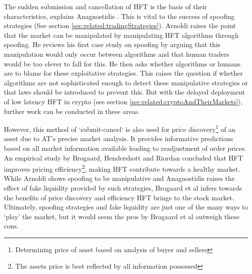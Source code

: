 The sudden submission and cancellation of HFT is the basis of their characteristics, explains Anagnostidis \cite{UNPUB:Anagnostidis:2017}. This is vital to the success of spoofing strategies (See section \ref{sec:related:tradingStrategies}). Arnoldi \cite{JOURNAL:Arnoldi:2016} raises the point that the market can be manipulated by manipulating HFT algorithms through spoofing. He reviews his first case study on spoofing by arguing that this manipulation would only occur between algorithms and that human traders would be too clever to fall for this. He then asks whether algorithms or humans are to blame for these exploitative strategies. This raises the question if whether algorithms are not sophisticated enough to detect these manipulative strategies or that laws should be introduced to prevent this. But with the delayed deployment of low latency HFT in crypto (see section \ref{sec:related:cryptoAndTheirMarkets}), further work can be conducted in these areas.

However, this method of `submit-cancel` is also used for price discovery\footnote{Determining price of asset based on analysis of buyer and sellers} of an asset due to AT's precise market analysis. It provides informative predictions based on all market information available leading to readjustment of order prices. An empirical study by Brogaard, Hendershott and Riordan \cite{UNPUB:Brogaard:2017} concluded that HFT improves pricing efficiency\footnote{The assets price is best reflected by all information possessed}, making HFT contribute towards a healthy market. While Arnoldi \cite{JOURNAL:Arnoldi:2016} shows spoofing to be manipulative and Anagnostidis \cite{UNPUB:Anagnostidis:2017} raises the effect of fake liquidity provided by such strategies, Brogaard et al \cite{UNPUB:Brogaard:2017} infers towards the benefits of price discovery and efficiency HFT brings to the stock market. Ultimately, spoofing strategies and fake liquidity are just one of the many ways to `play' the market, but it would seem the pros by Brogaard et al outweigh these cons.

